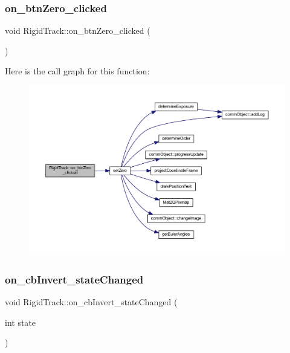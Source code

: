 \subsubsection{on\+\_\+btn\+Zero\+\_\+clicked}
{\footnotesize\ttfamily void Rigid\+Track\+::on\+\_\+btn\+Zero\+\_\+clicked (\begin{DoxyParamCaption}{ }\end{DoxyParamCaption})\hspace{0.3cm}{\ttfamily [slot]}}

Here is the call graph for this function\+:\nopagebreak
\begin{figure}[H]
\begin{center}
\leavevmode
\includegraphics[width=350pt]{class_rigid_track_afb1a4edcacc818db4ec6bb017dd07e0f_cgraph}
\end{center}
\end{figure}
\mbox{\label{class_rigid_track_ab347b3edeca55685f4d601549596d44a}} 
\subsubsection{on\+\_\+cb\+Invert\+\_\+state\+Changed}
{\footnotesize\ttfamily void Rigid\+Track\+::on\+\_\+cb\+Invert\+\_\+state\+Changed (\begin{DoxyParamCaption}\item[{int}]{state }\end{DoxyParamCaption})\hspace{0.3cm}{\ttfamily [slot]}}

\mbox{\label{class_rigid_track_ad6ba1cfe25f18ff0d9f5993aafa36d16}} 
